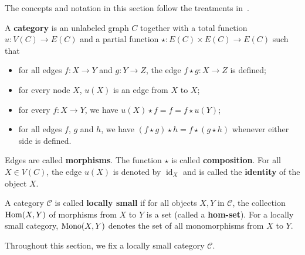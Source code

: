  The concepts and notation in this section follow the treatments in~\cite{pierce1991basic,barr1990category}.

\begin{definition}
    \label{def:cat}
    A \textbf{category} is an unlabeled graph \( C \) together with a total function \( u : V(C) \to E(C) \) and a partial function \( \star: E(C) \times E(C) \to E(C) \) such that 
        \begin{itemize}
            \item for all edges \( f:X \to Y \) and \( g:Y \to Z \), the edge \( f \star g :X \to Z \) is defined; 
            \item  for every node \( X \), \( u(X) \) is an edge from \( X \) to \( X \);
            \item for every \( f:X \to Y \), we have \(u(X) \star f = f = f \star u(Y)\);
            \item for all edges \( f \), \( g \) and \(h\), we have \( (f \star g) \star h = f \star (g \star h) \) whenever either side is defined.
        \end{itemize}
    Edges are called \textbf{morphisms}. The function $\star$ is called \textbf{composition}. For all \( X \in V(C) \), the edge \( u(X) \) is denoted by \( \operatorname{id}_X \) and is called the \textbf{identity} of the object \( X \).
\end{definition} 
\begin{definition}
    A category \(\mathcal{C}\) is called \textbf{locally small} if for all objects \(X,Y\) in \(\mathcal{C}\), the collection $\operatorname{Hom}(X,Y)$ of morphisms from \(X\) to \(Y\) is a set (called a \textbf{hom-set}). For a locally small category, $\operatorname{Mono}(X,Y)$ denotes the set of all monomorphisms from $X$ to $Y$.
\end{definition}
 Throughout this section, we fix a locally small category \( \mathcal{C} \).
